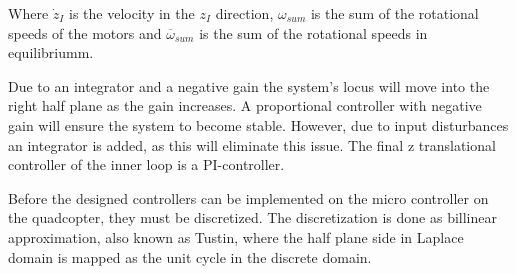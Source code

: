 Where $\dot{z}_I$ is the velocity in the $z_I$ direction, $\omega_{sum}$ is the sum of the rotational speeds of the motors and $\overline{\omega}_{sum}$ is the sum of the rotational speeds in equilibriumm.

Due to an integrator and a negative gain the system's locus will move into the right half plane as the gain increases.
A proportional controller with negative gain will ensure the system to become stable. However, due to input disturbances an integrator is added, as this will eliminate this issue. 
The final z translational controller of the inner loop is a PI-controller. 

Before the designed controllers can be implemented on the micro controller on the quadcopter, they must be discretized. 
The discretization is done as billinear approximation, also known as Tustin, where the half plane side in Laplace domain is mapped as the unit cycle in the discrete domain. 
